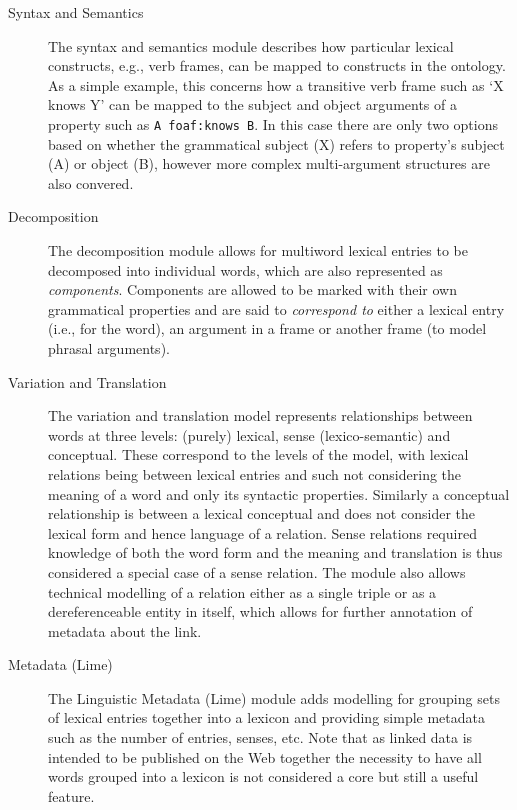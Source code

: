 \documentclass[12pt,a4paper]{elex2017}
\begin{document}
\begin{description}
    \item[Syntax and Semantics] The syntax and semantics module describes how
        particular lexical constructs, e.g., verb frames, can be mapped to
        constructs in the ontology. As a simple example, this concerns how a
        transitive verb frame such as `X knows Y' can be mapped to the subject
        and object arguments of a property such as \texttt{A foaf:knows B}. In this
        case there are only two options based on whether the grammatical subject
        (X) refers to property's subject (A) or object (B), however more complex
        multi-argument structures are also convered.
    \item[Decomposition] The decomposition module allows for multiword lexical
        entries to be decomposed into individual words, which are also
        represented as \emph{components}. Components are allowed to be marked
        with their own grammatical properties and are said to \emph{correspond
        to} either a lexical entry (i.e., for the word), an argument in a frame
        or another frame (to model phrasal arguments). 
    \item[Variation and Translation] The variation and translation model
        represents relationships between words at three levels: (purely)
        lexical, sense (lexico-semantic) and conceptual. These correspond
        to the levels of the model, with lexical relations being between lexical
        entries and such not considering the meaning of a word and only its
        syntactic properties. Similarly a conceptual relationship is between a
        lexical conceptual and does not consider the lexical form and hence
        language of a relation. Sense relations required knowledge of
        both the word form and the meaning and translation is thus considered a
        special case of a sense relation. The module also allows technical
        modelling of a relation either as a single triple or as a
        dereferenceable entity in itself, which allows for further annotation of
        metadata about the link.
    \item[Metadata (Lime)] The Linguistic Metadata (Lime) module adds modelling
        for grouping sets of lexical entries together into a lexicon and
        providing simple metadata such as the number of entries, senses, etc.
        Note that as linked data is intended to be published on the Web together
        the necessity to have all words grouped into a lexicon is not considered
        a core but still a useful feature.
\end{description}
\end{document}
